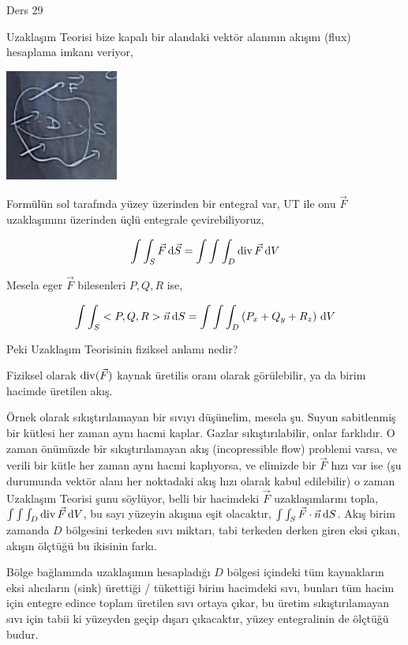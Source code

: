 \documentclass[12pt,fleqn]{article}\usepackage{../../common}
\begin{document}
Ders 29

Uzaklaşım Teorisi bize kapalı bir alandaki vektör alanının akışını (flux)
hesaplama imkanı veriyor, 

\includegraphics[width=10em]{calc_multi_29_02.jpg}

Formülün sol tarafında yüzey üzerinden bir entegral var, UT ile onu $\vec{F}$
uzaklaşımını üzerinden üçlü entegrale çevirebiliyoruz,

$$
\int \int_S \vec{F} \,\mathrm{d} \vec{S} =
\int \int \int_D \operatorname{div} \vec{F} \,\mathrm{d} V
$$

Mesela eger $\vec{F}$ bilesenleri $P,Q,R$ ise,

$$
\int \int_S < P,Q,R > \vec{n} \,\mathrm{d} S = \int \int \int_D \left( P_x + Q_y + R_z \right) \,\mathrm{d} V
$$

Peki Uzaklaşım Teorisinin fiziksel anlamı nedir?

Fiziksel olarak $\operatorname{div}(\vec{F})$ kaynak üretilis oranı olarak görülebilir,
ya da birim hacimde üretilen akış.

Örnek olarak sıkıştırılamayan bir sıvıyı düşünelim, mesela şu. Suyun sabitlenmiş
bir kütlesi her zaman aynı hacmi kaplar. Gazlar sıkıştırılabilir, onlar
farklıdır.  O zaman önümüzde bir sıkıştırılamayan akış (incopressible flow)
problemi varsa, ve verili bir kütle her zaman aynı hacmi kaplıyorsa, ve elimizde
bir $\vec{F}$ hızı var ise (şu durumunda vektör alanı her noktadaki akış hızı
olarak kabul edilebilir) o zaman Uzaklaşım Teorisi şunu söylüyor, belli bir
hacimdeki $\vec{F}$ uzaklaşımlarını topla, $\int \int \int_D \operatorname{div} \vec{F} \,\mathrm{d} V$, 
bu sayı yüzeyin akışına eşit olacaktır, $\int \int_S \vec{F} \cdot \vec{n} \,\mathrm{d} S$.
Akış birim zamanda $D$ bölgesini terkeden sıvı miktarı, tabi terkeden derken
giren eksi çıkan, akışın ölçtüğü bu ikisinin farkı.

Bölge bağlamında uzaklaşımın hesapladığı $D$ bölgesi içindeki tüm kaynakların
eksi alıcıların (sink) ürettiği / tükettiği birim hacimdeki sıvı, bunları
tüm hacim için entegre edince toplam üretilen sıvı ortaya çıkar, bu üretim
sıkıştırılamayan sıvı için tabii ki yüzeyden geçip dışarı çıkacaktır, yüzey
entegralinin de ölçtüğü budur.
\end{document}
